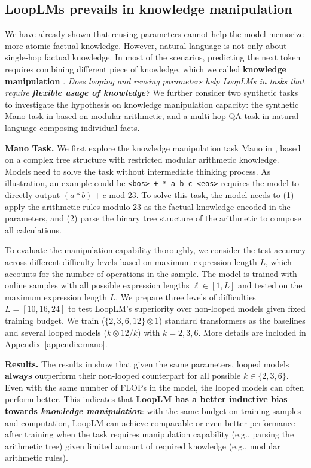 \documentclass[]{bytedance_seed}
\newcommand{\1}{\mathbf{1}}
\newcommand{\ut}{LoopLM}
\begin{document}
\subsection{\ut{}s prevails in knowledge manipulation}
\label{subsec:manipulation}
We have already shown that reusing parameters cannot help the model memorize more atomic factual knowledge. However, natural language is not only about single-hop factual knowledge. In most of the scenarios, predicting the next token requires combining different piece of knowledge, which we called \textbf{knowledge manipulation} \cite{AL2024-knowledge3}. \textit{Does looping and reusing parameters help \ut{}s in tasks that require \textbf{flexible usage of knowledge}?} We further consider two synthetic tasks to investigate the hypothesis on {{knowledge manipulation}} capacity: the synthetic Mano task in \cite{Allenzhu2025-canon} based on modular arithmetic, and a multi-hop QA task in natural language \cite{yao2025language} composing individual facts. 

\textbf{Mano Task.} We first explore the knowledge manipulation task Mano in \cite{Allenzhu2025-canon}, based on a complex tree structure with restricted modular arithmetic knowledge. Models need to solve the task without intermediate thinking process. As illustration, an example could be \texttt{<bos> + * a b c <eos>} requires the model to directly output $(a*b)+c$ mod 23. To solve this task, the model needs to (1) apply the arithmetic rules modulo 23 as the factual knowledge encoded in the parameters, and (2) parse the binary tree structure of the arithmetic to compose all calculations. 

To evaluate the manipulation capability thoroughly, we consider the test accuracy across different difficulty levels based on maximum expression length $L$, which accounts for the number of operations in the sample. The model is trained with online samples with all possible expression lengths $\ell\in[1, L]$ and tested on the maximum expression length $L$. We prepare three levels of difficulties $L=[10, 16, 24]$ to test \ut{}'s superiority over non-looped models given fixed training budget. We train ($\{2,3,6,12\}\otimes 1$) standard transformers as the baselines and several looped models ($k\otimes 12/k$) with $k=2,3,6$. More details are included in Appendix~\ref{appendix:mano}. 

\textbf{Results.} The results in  show that given the same parameters, looped models \textbf{always} outperform their non-looped counterpart for all possible $k\in\{2,3,6\}$. Even with the same number of FLOPs in the model, the looped models can often perform better. This indicates that\textbf{ \ut{} has a better inductive bias towards \textit{knowledge manipulation}}: with the same budget on training samples and computation, \ut{} can achieve comparable or even better performance after training when the task requires manipulation capability (e.g., parsing the arithmetic tree) given limited amount of required knowledge (e.g., modular arithmetic rules).  
\end{document}
